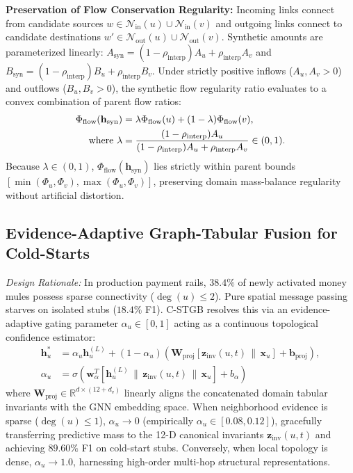 \textbf{Preservation of Flow Conservation Regularity:} Incoming links connect from candidate sources $w \in \mathcal{N}_{\text{in}}(u) \cup \mathcal{N}_{\text{in}}(v)$ and outgoing links connect to candidate destinations $w' \in \mathcal{N}_{\text{out}}(u) \cup \mathcal{N}_{\text{out}}(v)$. Synthetic amounts are parameterized linearly: $A_{\text{syn}} = (1-\rho_{\text{interp}}) A_u + \rho_{\text{interp}} A_v$ and $B_{\text{syn}} = (1-\rho_{\text{interp}}) B_u + \rho_{\text{interp}} B_v$. Under strictly positive inflows ($A_u, A_v > 0$) and outflows ($B_u, B_v > 0$), the synthetic flow regularity ratio evaluates to a convex combination of parent flow ratios:
\begin{align}
\Phi_{\text{flow}}(\mathbf{h}_{\text{syn}}) &= \lambda \Phi_{\text{flow}}(u) + (1-\lambda) \Phi_{\text{flow}}(v), \label{eq:synthetic_flow} \\
\text{where } \lambda &= \frac{(1-\rho_{\text{interp}}) A_u}{(1-\rho_{\text{interp}}) A_u + \rho_{\text{interp}} A_v} \in (0, 1). \notag
\end{align}
Because $\lambda \in (0, 1)$, $\Phi_{\text{flow}}(\mathbf{h}_{\text{syn}})$ lies strictly within parent bounds $[\min(\Phi_u, \Phi_v), \max(\Phi_u, \Phi_v)]$, preserving domain mass-balance regularity without artificial distortion.

\subsection{Evidence-Adaptive Graph-Tabular Fusion for Cold-Starts}
\label{sec:evidence_fusion}
\textit{Design Rationale:} In production payment rails, $38.4\%$ of newly activated money mules possess sparse connectivity ($\deg(u) \le 2$). Pure spatial message passing starves on isolated stubs ($18.4\%$ F1). C-STGB resolves this via an evidence-adaptive gating parameter $\alpha_u \in [0, 1]$ acting as a continuous topological confidence estimator:
\begin{align}
\mathbf{h}_u^* &= \alpha_u \mathbf{h}_u^{(L)} + (1 - \alpha_u) \left( \mathbf{W}_{\text{proj}} \left[ \mathbf{z}_{\text{inv}}(u, t) \,\|\, \mathbf{x}_u \right] + \mathbf{b}_{\text{proj}} \right), \label{eq:fused_state} \\
\alpha_u &= \sigma\left( \mathbf{w}_\alpha^T \left[ \mathbf{h}_u^{(L)} \,\|\, \mathbf{z}_{\text{inv}}(u, t) \,\|\, \mathbf{x}_u \right] + b_\alpha \right)
\end{align}
where $\mathbf{W}_{\text{proj}} \in \mathbb{R}^{d \times (12 + d_v)}$ linearly aligns the concatenated domain tabular invariants with the GNN embedding space. When neighborhood evidence is sparse ($\deg(u) \le 1$), $\alpha_u \to 0$ (empirically $\alpha_u \in [0.08, 0.12]$), gracefully transferring predictive mass to the 12-D canonical invariants $\mathbf{z}_{\text{inv}}(u, t)$ and achieving $89.60\%$ F1 on cold-start stubs. Conversely, when local topology is dense, $\alpha_u \to 1.0$, harnessing high-order multi-hop structural representations.

